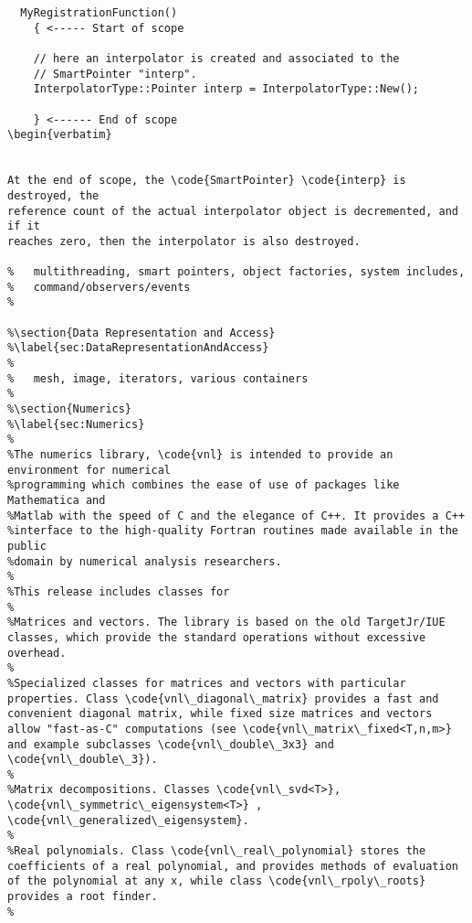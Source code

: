 \begin{verbatim}
  MyRegistrationFunction()
    { <----- Start of scope

    // here an interpolator is created and associated to the
    // SmartPointer "interp".
    InterpolatorType::Pointer interp = InterpolatorType::New();

    } <------ End of scope
\begin{verbatim}


At the end of scope, the \code{SmartPointer} \code{interp} is destroyed, the
reference count of the actual interpolator object is decremented, and if it
reaches zero, then the interpolator is also destroyed.

%	multithreading, smart pointers, object factories, system includes,
%	command/observers/events
%

%\section{Data Representation and Access}
%\label{sec:DataRepresentationAndAccess}
%
%	mesh, image, iterators, various containers
%
%\section{Numerics}
%\label{sec:Numerics}
%
%The numerics library, \code{vnl} is intended to provide an environment for numerical
%programming which combines the ease of use of packages like Mathematica and
%Matlab with the speed of C and the elegance of C++. It provides a C++
%interface to the high-quality Fortran routines made available in the public
%domain by numerical analysis researchers.
%
%This release includes classes for 
%
%Matrices and vectors. The library is based on the old TargetJr/IUE classes, which provide the standard operations without excessive overhead. 
%
%Specialized classes for matrices and vectors with particular properties. Class \code{vnl\_diagonal\_matrix} provides a fast and convenient diagonal matrix, while fixed size matrices and vectors allow "fast-as-C" computations (see \code{vnl\_matrix\_fixed<T,n,m>} and example subclasses \code{vnl\_double\_3x3} and \code{vnl\_double\_3}). 
%
%Matrix decompositions. Classes \code{vnl\_svd<T>}, \code{vnl\_symmetric\_eigensystem<T>} , \code{vnl\_generalized\_eigensystem}. 
%
%Real polynomials. Class \code{vnl\_real\_polynomial} stores the coefficients of a real polynomial, and provides methods of evaluation of the polynomial at any x, while class \code{vnl\_rpoly\_roots} provides a root finder. 
%

\end{verbatim}
